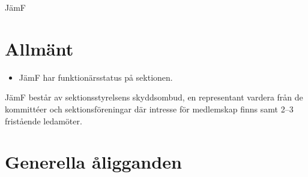 \documentclass[a4paper]{article}
\begin{document}
\renewcommand{\forening}{JämF} %
\begin{foreningenv}{\forening{}} %
    \section{Allmänt}
    \begin{itemize}
        \item JämF har funktionärsstatus på sektionen.
    \end{itemize}
    JämF består av sektionsstyrelsens skyddsombud, en representant vardera från de kommittéer och sektionsföreningar där intresse för medlemskap finns samt 2–3 fristående ledamöter.
    
    \section{Generella åligganden}
    \aliggsektfunkt{} %

\end{foreningenv}
\end{document}

